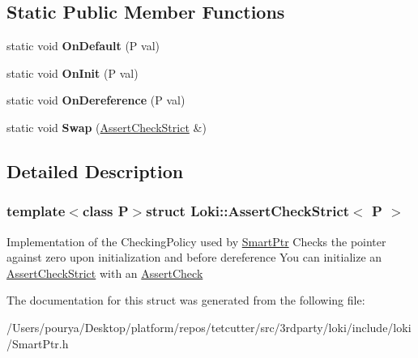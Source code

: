 \subsection*{Static Public Member Functions}
\begin{DoxyCompactItemize}
\item 
\hypertarget{structLoki_1_1AssertCheckStrict_ab385b07fe877f0b084a1e93f476942f7}{}static void {\bfseries On\+Default} (P val)\label{structLoki_1_1AssertCheckStrict_ab385b07fe877f0b084a1e93f476942f7}

\item 
\hypertarget{structLoki_1_1AssertCheckStrict_a9d2bd0610cfa7f22463c6623f34f117c}{}static void {\bfseries On\+Init} (P val)\label{structLoki_1_1AssertCheckStrict_a9d2bd0610cfa7f22463c6623f34f117c}

\item 
\hypertarget{structLoki_1_1AssertCheckStrict_a68b82d35c44986d8a941ab9475ba1402}{}static void {\bfseries On\+Dereference} (P val)\label{structLoki_1_1AssertCheckStrict_a68b82d35c44986d8a941ab9475ba1402}

\item 
\hypertarget{structLoki_1_1AssertCheckStrict_a7760f71a9daf6ee0fdf98e23cc4b68e3}{}static void {\bfseries Swap} (\hyperlink{structLoki_1_1AssertCheckStrict}{Assert\+Check\+Strict} \&)\label{structLoki_1_1AssertCheckStrict_a7760f71a9daf6ee0fdf98e23cc4b68e3}

\end{DoxyCompactItemize}


\subsection{Detailed Description}
\subsubsection*{template$<$class P$>$struct Loki\+::\+Assert\+Check\+Strict$<$ P $>$}

Implementation of the Checking\+Policy used by \hyperlink{classLoki_1_1SmartPtr}{Smart\+Ptr} Checks the pointer against zero upon initialization and before dereference You can initialize an \hyperlink{structLoki_1_1AssertCheckStrict}{Assert\+Check\+Strict} with an \hyperlink{structLoki_1_1AssertCheck}{Assert\+Check} 

The documentation for this struct was generated from the following file\+:\begin{DoxyCompactItemize}
\item 
/\+Users/pourya/\+Desktop/platform/repos/tetcutter/src/3rdparty/loki/include/loki/Smart\+Ptr.\+h\end{DoxyCompactItemize}
